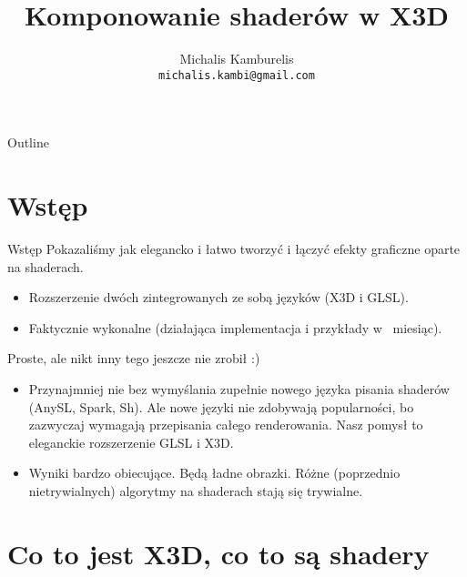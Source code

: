 \documentclass{beamer}
\title{Komponowanie shaderów w X3D}
\author[Michalis Kamburelis]{Michalis Kamburelis \\ \texttt{michalis.kambi@gmail.com}}
\begin{document}
\begin{frame}
  \titlepage
\end{frame}

\begin{frame}{Outline}
  \tableofcontents
\end{frame}

\section{Wstęp}

\begin{frame}{Wstęp}
Pokazaliśmy jak elegancko i łatwo tworzyć i łączyć efekty graficzne
oparte na shaderach.

\begin{itemize}
  \item Rozszerzenie dwóch zintegrowanych ze sobą języków (X3D i GLSL).
  \item Faktycznie wykonalne (działająca implementacja i przykłady w ~miesiąc).
\end{itemize}

Proste, ale nikt inny tego jeszcze nie zrobił :)

\begin{itemize}
  \item Przynajmniej nie bez wymyślania zupełnie nowego języka pisania shaderów
    (AnySL, Spark, Sh). Ale nowe języki nie zdobywają popularności,
    bo zazwyczaj wymagają przepisania całego renderowania.
    Nasz pomysł to eleganckie rozszerzenie GLSL  i X3D.
  \item Wyniki bardzo obiecujące. Będą ładne obrazki.
    Różne (poprzednio nietrywialnych) algorytmy na shaderach stają się
    trywialne.
\end{itemize}
\end{frame}

\section{Co to jest X3D, co to są shadery}
\end{document}
